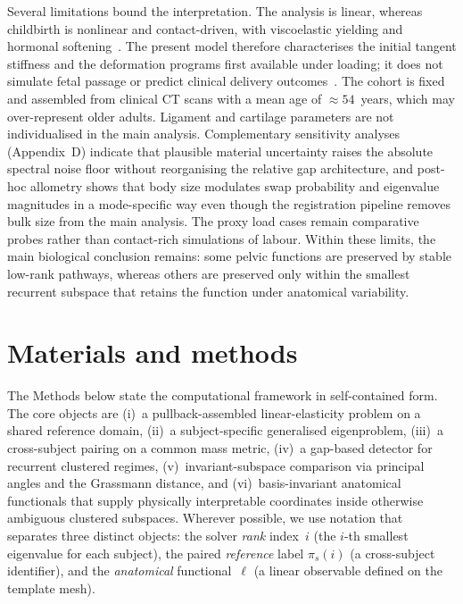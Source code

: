 \documentclass[11pt]{article}
\begin{document}
Several limitations bound the interpretation.
The analysis is linear, whereas childbirth is nonlinear and contact-driven, with viscoelastic yielding and hormonal softening~\citep{BiomechPregnancy2022,ChenGrimm2021,Almeida2024Uterus,Vleeming2012}.
The present model therefore characterises the initial tangent stiffness and the deformation programs first available under loading; it does not simulate fetal passage or predict clinical delivery outcomes~\citep{BonetWood1997}.
The cohort is fixed and assembled from clinical CT scans with a mean age of $\approx 54$~years, which may over-represent older adults.
Ligament and cartilage parameters are not individualised in the main analysis.
Complementary sensitivity analyses (Appendix~D) indicate that plausible material uncertainty raises the absolute spectral noise floor without reorganising the relative gap architecture, and post-hoc allometry shows that body size modulates swap probability and eigenvalue magnitudes in a mode-specific way even though the registration pipeline removes bulk size from the main analysis.
The proxy load cases remain comparative probes rather than contact-rich simulations of labour.
Within these limits, the main biological conclusion remains: some pelvic functions are preserved by stable low-rank pathways, whereas others are preserved only within the smallest recurrent subspace that retains the function under anatomical variability.

\section{Materials and methods}
\label{sec:methods}

The Methods below state the computational framework in self-contained form.
The core objects are (i)~a pullback-assembled linear-elasticity problem on a shared reference domain, (ii)~a subject-specific generalised eigenproblem, (iii)~a cross-subject pairing on a common mass metric, (iv)~a gap-based detector for recurrent clustered regimes, (v)~invariant-subspace comparison via principal angles and the Grassmann distance, and (vi)~basis-invariant anatomical functionals that supply physically interpretable coordinates inside otherwise ambiguous clustered subspaces.
Wherever possible, we use notation that separates three distinct objects: the solver \emph{rank} index~$i$ (the $i$-th smallest eigenvalue for each subject), the paired \emph{reference} label $\pi_s(i)$ (a cross-subject identifier), and the \emph{anatomical} functional~$\ell$ (a linear observable defined on the template mesh).
\end{document}
